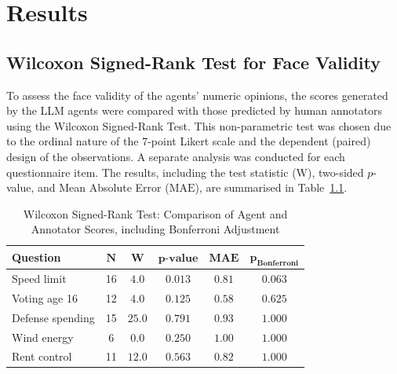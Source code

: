 

\chapter{Results}
\label{chap:results} 

\section{Wilcoxon Signed-Rank Test for Face Validity}

To assess the face validity of the agents’ numeric opinions, the scores generated by the LLM agents were compared with those predicted by human annotators using the Wilcoxon Signed-Rank Test. This non-parametric test was chosen due to the ordinal nature of the 7-point Likert scale and the dependent (paired) design of the observations. A separate analysis was conducted for each questionnaire item. The results, including the test statistic ($\text{W}$), two-sided $p$-value, and Mean Absolute Error ($\text{MAE}$), are summarised in Table~\ref{tab:wilcoxon_results_bonferroni}.

\begin{table}[!htbp]
\centering
\caption{Wilcoxon Signed-Rank Test: Comparison of Agent and Annotator Scores, including Bonferroni Adjustment}
\label{tab:wilcoxon_results_bonferroni}
\begin{tabular}{l c c c c c}
\toprule
\textbf{Question} & $\mathbf{N}$ & $\mathbf{W}$ & $\mathbf{p\text{-value}}$ & $\mathbf{MAE}$ & $\mathbf{p_{\text{Bonferroni}}}$ \\
\midrule
Speed limit & 16 & $4.0$ & $0.013$ & $0.81$ & $0.063$ \\
Voting age 16 & 12 & $4.0$ & $0.125$ & $0.58$ & $0.625$  \\
Defense spending & 15 & $25.0$ & $0.791$ & $0.93$ & $1.000$ \\
Wind energy & 6 & $0.0$ & $0.250$ & $1.00$ & $1.000$ \\
Rent control & 11 & $12.0$ & $0.563$ & $0.82$ & $1.000$ \\
\bottomrule
\end{tabular}
\end{table}


